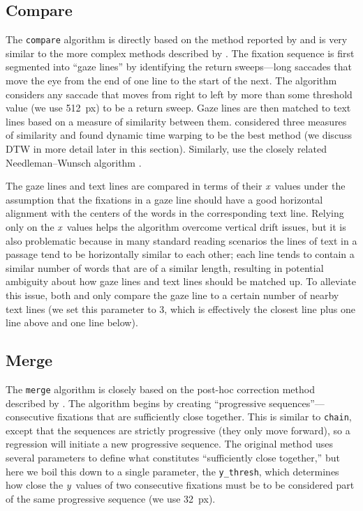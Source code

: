 \documentclass[doc,biblatex]{apa7}
\begin{document}
\subsection{Compare}

The \texttt{compare} algorithm is directly based on the method reported by \textcite{LimaSanches:2015} and is very similar to the more complex methods described by \textcite{Yamaya:2017}. The fixation sequence is first segmented into ``gaze lines'' by identifying the return sweeps---long saccades that move the eye from the end of one line to the start of the next. The algorithm considers any saccade that moves from right to left by more than some threshold value (we use 512~px) to be a return sweep. Gaze lines are then matched to text lines based on a measure of similarity between them. \textcite{LimaSanches:2015} considered three measures of similarity and found dynamic time warping \parencite[DTW;][]{Vintsyuk:1968,Sakoe:1978} to be the best method (we discuss DTW in more detail later in this section). Similarly, \textcite{Yamaya:2017} use the closely related Needleman--Wunsch algorithm \parencite{Needleman:1970}.

The gaze lines and text lines are compared in terms of their \textit{x}~values under the assumption that the fixations in a gaze line should have a good horizontal alignment with the centers of the words in the corresponding text line. Relying only on the \textit{x}~values helps the algorithm overcome vertical drift issues, but it is also problematic because in many standard reading scenarios the lines of text in a passage tend to be horizontally similar to each other; each line tends to contain a similar number of words that are of a similar length, resulting in potential ambiguity about how gaze lines and text lines should be matched up. To alleviate this issue, both \textcite{LimaSanches:2015} and \textcite{Yamaya:2017} only compare the gaze line to a certain number of nearby text lines (we set this parameter to 3, which is effectively the closest line plus one line above and one line below).

\subsection{Merge}

The \texttt{merge} algorithm is closely based on the post-hoc correction method described by \textcite{Spakov:2019}. The algorithm begins by creating ``progressive sequences''---consecutive fixations that are sufficiently close together. This is similar to \texttt{chain}, except that the sequences are strictly progressive (they only move forward), so a regression will initiate a new progressive sequence. The original method uses several parameters to define what constitutes ``sufficiently close together,'' but here we boil this down to a single parameter, the \texttt{y\_thresh}, which determines how close the \textit{y}~values of two consecutive fixations must be to be considered part of the same progressive sequence (we use 32~px).
\end{document}
